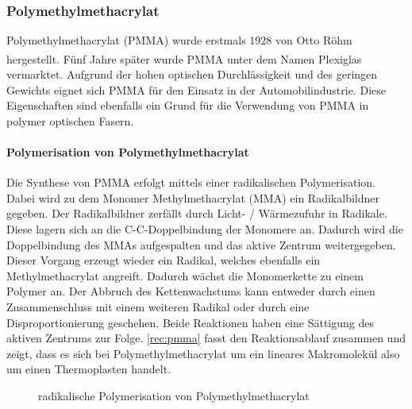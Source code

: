 \subsubsection{Polymethylmethacrylat}
\label{subsec:pofpmma}

Polymethylmethacrylat (PMMA) wurde erstmals 1928 von Otto Röhm hergestellt. Fünf
Jahre später wurde PMMA unter dem Namen
Plexiglas\textsuperscript{\textregistered} vermarktet. Aufgrund der hohen
optischen Durchlässigkeit und des geringen Gewichts eignet sich PMMA für den
Einsatz in der Automobilindustrie. Diese Eigenschaften sind ebenfalls ein
Grund für die Verwendung von PMMA in polymer optischen Fasern. \cite{pofwuppmma}

\paragraph{Polymerisation von Polymethylmethacrylat} Die Synthese von PMMA
erfolgt mittels einer radikalischen Polymerisation. Dabei wird zu dem Monomer
Methylmethacrylat (MMA) ein Radikalbildner gegeben. Der Radikalbildner zerfällt
durch Licht- / Wärmezufuhr in Radikale. Diese lagern sich an die
C-C-Doppelbindung der Monomere an. Dadurch wird die Doppelbindung des MMAs
aufgespalten und das aktive Zentrum weitergegeben. Dieser Vorgang erzeugt wieder
ein Radikal, welches ebenfalls ein Methylmethacrylat angreift. Dadurch wächst
die Monomerkette zu einem Polymer an. Der Abbruch des Kettenwachstums kann
entweder durch einen Zusammenschluss mit einem weiteren Radikal oder durch eine
Disproportionierung geschehen. Beide Reaktionen haben eine Sättigung des aktiven
Zentrums zur Folge. \autoref{rec:pmma} fasst den Reaktionsablauf zusammen und
zeigt, dass es sich bei Polymethylmethacrylat um ein lineares Makromolekül also
um einen Thermoplasten handelt.

\begin{figure}[H]
    \begin{center}
        \footnotesize
        \setatomsep{1.7em}


        \chemrel{->}

        \caption{radikalische Polymerisation von Polymethylmethacrylat}
        \label{rec:pmma}
    \end{center}
\end{figure}


